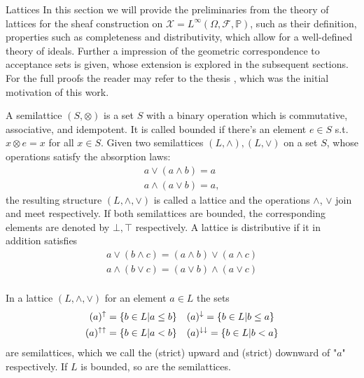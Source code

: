     \begin{subsection}{Lattices}
    In this section we will provide the preliminaries from the theory of lattices for the sheaf construction
    on \( \mathcal{X} = L^\infty(\Omega, \mathcal{F}, \mathbb{P}) \), such as their definition, properties
    such as completeness and distributivity, which allow for a well-defined theory of ideals. Further a impression 
    of the geometric correspondence to acceptance sets is given, whose extension is explored in the subsequent sections.
    For the full proofs the reader may refer to the thesis \cite{mymaster}, which was the initial motivation of this work. 

    \begin{definition}
        A semilattice \( (S, \otimes ) \) is a set \( S \) with a binary operation which is 
        commutative, associative, and idempotent. It is called bounded if there's an element 
        \( e \in S \) s.t. \( x \otimes e = x \) for all \( x \in S \).
        Given two semilattices \( (L, \wedge), (L, \vee) \) on a set \( S \), whose operations
        satisfy the absorption laws:
        \begin{align*}
            a \vee (a \wedge b) = a  \\
            a \wedge (a \vee b) = a,
        \end{align*}
        the resulting structure \( (L, \wedge, \vee) \) is called a lattice and the operations \( \wedge \), \( \vee \) join and meet respectively.
        If both semilattices are bounded, the corresponding elements are denoted by \( \bot,\top \) respectively.
        A lattice is distributive if it in addition satisfies
        \begin{align*}
         a \vee (b \wedge c) = (a \wedge b) \vee (a \wedge c)  \\
         a \wedge (b \vee c) = (a \vee b) \wedge (a \vee c)  \\
        \end{align*}
    \end{definition}

    \begin{lemma}
        In a lattice \( (L, \wedge, \vee) \) for an element \( a \in L \) the sets
        \begin{align*}
            (a)^\uparrow &= \{ b \in L | a \leq b\}   \quad (a)^\downarrow = \{ b \in L | b \leq a\}  \\
            (a)^{{\uparrow \uparrow }} &= \{ b \in L | a < b\} \quad (a)^{{\downarrow \downarrow }} = \{ b \in L | b < a\}  
        \end{align*}
        are semilattices, which we call the (strict) upward and (strict) downward of "\( a \)" respectively.
        If \( L \) is bounded, so are the semilattices.
    \end{lemma}


\end{subsection}
